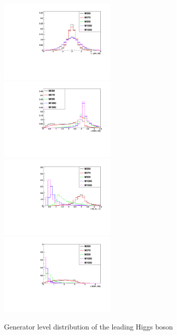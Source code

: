 \begin{figure}[htb]
  \centering
  \includegraphics[width=0.5\textwidth]{Images/ResonantHH/gen_deltaEta_H1_H2.pdf}%
  \includegraphics[width=0.5\textwidth]{Images/ResonantHH/gen_deltaR_H1_H2.pdf}\\
  \includegraphics[width=0.5\textwidth]{Images/ResonantHH/gen_deltaR_Photon0_Photon1.pdf}%
  \includegraphics[width=0.5\textwidth]{Images/ResonantHH/gen_deltaR_Wp_Wm.pdf}
\caption{Generator level distribution of the leading Higgs boson} \label{fig:diagram}
\end{figure}


